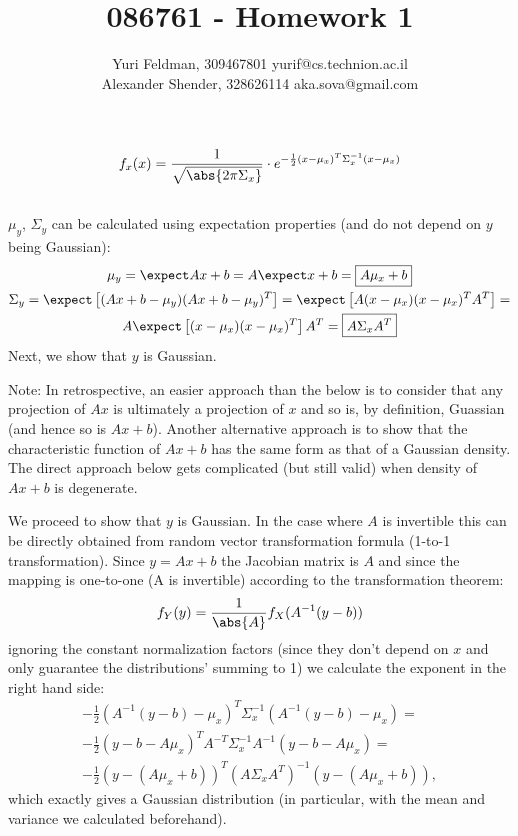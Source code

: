 \documentclass[a4paper]{scrreprt}
\title{086761 - Homework 1}
\author{Yuri Feldman, 309467801 yurif@cs.technion.ac.il \\
	    Alexander Shender, 328626114 aka.sova@gmail.com }
\begin{document}
\maketitle
\chapter{}
\section{}
\begin{gather}
	f_x(x) = \frac{1}{\sqrt{\abs{2\pi\Sigma_x}}} \cdot 
	e^{-\frac{1}{2}(x-\mu_x)^T\Sigma_x^{-1} (x-\mu_x)}
\end{gather}
\section{}
$\mu_y$, $\Sigma_y$ can be calculated using expectation properties (and do not 
depend on $y$ being Gaussian):
\begin{gather}
	\mu_y = \expect Ax + b = A\expect x + b = \boxed{A\mu_x + b} \\
	\Sigma_y = \expect\left[ (Ax+b-\mu_y)(Ax+b-\mu_y)^T\right] = 
	\expect\left[ A(x-\mu_x)(x-\mu_x)^T A^T \right] = \\
	A\expect\left[ 
	(x-\mu_x)(x-\mu_x)^T\right] A^T = \boxed{A\Sigma_x A^T}
\end{gather}
Next, we show that $y$ is Gaussian. 

Note: In retrospective, an easier approach than the below is to consider that any projection of $Ax$ is ultimately a projection of $x$ and so is, by definition, Guassian (and hence so is $Ax+b$). Another alternative approach is to show that the characteristic function of $Ax+b$ has the same form as that of a Gaussian density. The direct approach below gets complicated (but still valid) when density of $Ax+b$ is degenerate. 

We proceed to show that $y$ is Gaussian. In the case where $A$ is invertible this 
can be directly obtained from random vector transformation formula (1-to-1 
transformation). Since $y=Ax+b$ the Jacobian matrix is $A$ and since the 
mapping is one-to-one (A is invertible) according to the transformation 
theorem: 
\begin{gather}
	f_Y(y) = \frac{1}{\abs{A}} f_X(A^{-1}(y-b))
\end{gather}
ignoring the constant normalization factors (since they don't depend on $x$ and 
only guarantee the distributions' summing to 1) we calculate the exponent in 
the 
right hand side: 
\begin{gather}
	-\frac{1}{2}\left(A^{-1}(y-b)-\mu_x\right)^T\Sigma_x^{-1}\left(A^{-1}(y-b)-\mu_x\right)
	 = \\
	-\frac{1}{2}\left(y-b-A\mu_x\right)^TA^{-T}\Sigma_x^{-1}A^{-1}\left(y-b-A\mu_x\right)
	 = \\
		-\frac{1}{2}\left(y-(A\mu_x+b)\right)^T\left(A\Sigma_xA^T\right)^{-1}\left(y-(A\mu_x+b)\right),
\end{gather}
which exactly gives a Gaussian distribution (in particular, with the mean and 
variance we calculated beforehand). 
\end{document}
